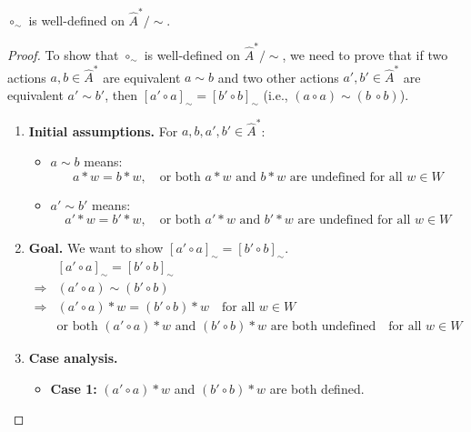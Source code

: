 \begin{proposition}
    $\circ_{\sim}$ is well-defined on $\hat{A}^{\ast}/\sim$.
\end{proposition}
\begin{proof}
    To show that $\circ_{\sim}$ is well-defined on $\hat{A}^{\ast}/\sim$, we need to prove that if two actions $a,b \in \hat{A}^{\ast}$ are equivalent $a \sim b$ and two other actions $a', b' \in \hat{A}^{\ast}$ are equivalent $a' \sim b'$, then $[a' \circ a]_{\sim} = [b' \circ b]_{\sim}$ (i.e., $(a \circ a) \sim (b\ \circ b)$).

    \begin{enumerate}[(1)]
    \item \textbf{Initial assumptions.}
    For $a, b, a', b' \in \hat{A}^{\ast}$:
    \begin{itemize}
        \item $a \sim b$ means:
        \begin{equation}
            a \ast w = b \ast w, \quad \text{or both }a \ast w\text{ and }b \ast w\text{ are undefined} \text{ for all } w\in W
        \end{equation}
        \item $a' \sim b'$ means:
        \begin{equation}
            a' \ast w = b' \ast w, \quad \text{or both } a' \ast w \text{ and } b' \ast w\text{ are undefined} \text{ for all } w\in W
        \end{equation}
    \end{itemize}

    \item \textbf{Goal.}
    We want to show $[a' \circ a]_{\sim} = [b' \circ b]_{\sim}$.
    \begin{align}
        &[a' \circ a]_{\sim} = [b' \circ b]_{\sim} \\
        \Rightarrow &(a' \circ a) \sim (b' \circ b) \\
        \Rightarrow &(a' \circ a) \ast w = (b' \circ b) \ast w \quad \text{for all } w \in W \\
        &\text{or both } (a' \circ a) \ast w \text{ and } (b' \circ b) \ast w \text{ are both undefined} \quad \text{for all } w \in W 
    \end{align}

    \item \textbf{Case analysis.}
    \begin{itemize}
        \item \textbf{Case 1:}
        $(a' \circ a) \ast w$ and $(b' \circ b) \ast w$ are both defined.
        

\end{itemize}
\end{enumerate}
\end{proof}
